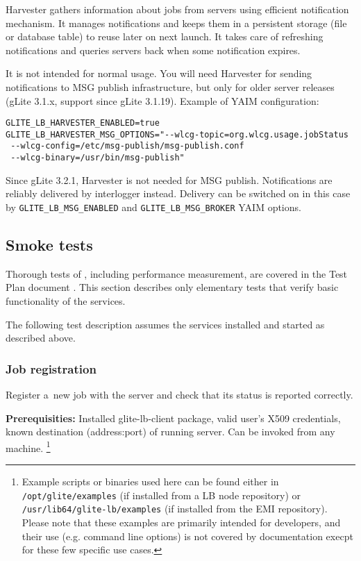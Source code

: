 \LB Harvester gathers information about jobs from \LB servers using efficient
\LB notification mechanism. It manages notifications and keeps them in
a persistent storage (file or database table) to reuse later on next launch.
It takes care of refreshing notifications and queries \LB servers back when
some notification expires.

It is not intended for normal usage. You will need Harvester for sending notifications to MSG publish infrastructure, but only for older \LB server releases (gLite 3.1.x, support since gLite 3.1.19). Example of YAIM configuration:

\begin{verbatim}
GLITE_LB_HARVESTER_ENABLED=true
GLITE_LB_HARVESTER_MSG_OPTIONS="--wlcg-topic=org.wlcg.usage.jobStatus 
 --wlcg-config=/etc/msg-publish/msg-publish.conf 
 --wlcg-binary=/usr/bin/msg-publish"
\end{verbatim}

Since gLite 3.2.1, \LB Harvester is not needed for MSG publish. Notifications are reliably delivered by interlogger instead. Delivery can be switched on in this case by \texttt{GLITE\_LB\_MSG\_ENABLED} and \texttt{GLITE\_LB\_MSG\_BROKER} YAIM options.

\subsection{Smoke tests}

Thorough tests of \LB, including performance measurement, are
covered in the \LB Test Plan document \cite{lbtp}.
This section describes only elementary tests that verify basic
functionality of the services.

The following test description assumes the \LB services installed
and started as described above.

\def\req{\noindent\textbf{Prerequisities:}\xspace}
\def\how{\noindent\textbf{How to run:}\xspace}
\def\result{\noindent\textbf{Expected result:}\xspace}

\subsubsection{Job registration}

Register a~new job with the \LB server and check that its status is
reported correctly.

\req Installed glite-lb-client package, valid user's X509 credentials,
known destination (address:port) of running \LB server.
Can be invoked from any machine.
\footnote{Example scripts or binaries used here can be found either
in \texttt{/opt/glite/examples} (if installed from a LB node repository) or
\texttt{/usr/lib64/glite-lb/examples} (if installed from the EMI repository). Please note that these examples are primarily intended for developers, and their use (e.g. command line options) is not covered by documentation execpt for these few specific use cases.}\setcounter{examplesfootnote}{\thefootnote}

